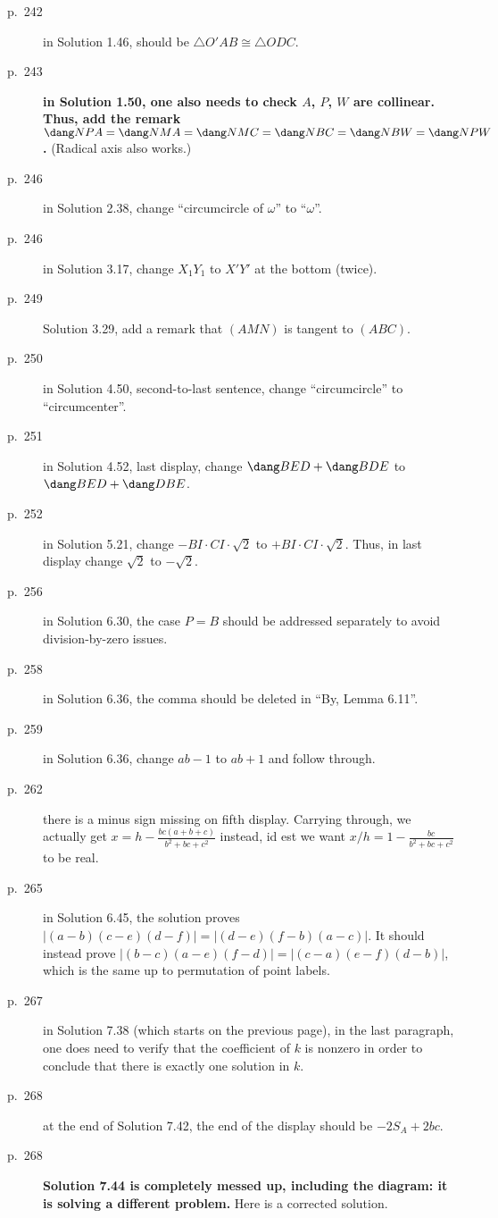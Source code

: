 \documentclass[11pt]{scrartcl}
\newcommand{\crucial}[1]{\textbf{\sffamily\large\color{red} #1}}
\begin{document}
\begin{description}
\item[p.\  242] in Solution 1.46, should be $\triangle O'AB \cong \triangle ODC$.
\item[p.\  243] \crucial{in Solution 1.50, one also needs to check $A$, $P$, $W$ are collinear.
  Thus, add the remark $\dang NPA = \dang NMA = \dang NMC = \dang NBC = \dang NBW = \dang NPW$.}
  (Radical axis also works.)
\item[p.\  246] in Solution 2.38, change ``circumcircle of $\omega$'' to ``$\omega$''.
\item[p.\  246] in Solution 3.17, change $X_1Y_1$ to $X'Y'$ at the bottom (twice).
\item[p.\  249] Solution 3.29, add a remark that $(AMN)$ is tangent to $(ABC)$.
\item[p.\  250] in Solution 4.50, second-to-last sentence, change ``circumcircle'' to ``circumcenter''.
\item[p.\  251] in Solution 4.52, last display,
  change $\dang BED + \dang BDE$ to $\dang BED + \dang DBE$.
\item[p.\  252] in Solution 5.21, change $-BI \cdot CI \cdot \sqrt2$ to $+ BI \cdot CI \cdot \sqrt2$.
  Thus, in last display change $\sqrt2$ to $-\sqrt2$.
\item[p.\  256] in Solution 6.30, the case $P=B$ should be addressed separately to avoid division-by-zero issues.
\item[p.\  258] in Solution 6.36, the comma should be deleted in ``By, Lemma 6.11''.
\item[p.\  259] in Solution 6.36, change $ab-1$ to $ab+1$ and follow through.
\item[p.\  262] there is a minus sign missing on fifth display.
  Carrying through, we actually get $x = h - \frac{bc(a+b+c)}{b^2+bc+c^2}$ instead,
  id est we want $x/h = 1 - \frac{bc}{b^2+bc+c^2}$ to be real.
\item[p.\  265] in Solution 6.45, the solution proves $|(a-b)(c-e)(d-f)|=|(d-e)(f-b)(a-c)|$.
  It should instead prove $|(b-c)(a-e)(f-d)|=|(c-a)(e-f)(d-b)|$,
  which is the same up to permutation of point labels.
\item[p.\ 267] in Solution 7.38 (which starts on the previous page),
  in the last paragraph, one does need to verify that the coefficient of $k$ is nonzero
  in order to conclude that there is exactly one solution in $k$.
\item[p.\  268] at the end of Solution 7.42, the end of the display should be $-2S_A+2bc$.
\item[p.\  268] \crucial{Solution 7.44 is completely messed up,
  including the diagram: it is solving a different problem.}
  Here is a corrected solution.


\end{description}
\end{document}
